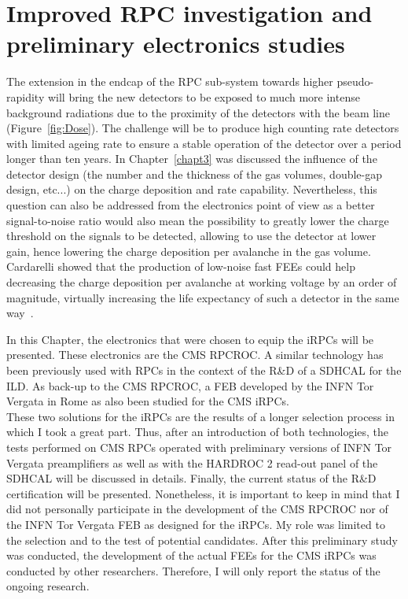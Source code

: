 \renewcommand\evenpagerightmark{{\scshape\small Chapter 6}}
\renewcommand\oddpageleftmark{{\scshape\small Improved RPC investigation and preliminary electronics studies}}

\renewcommand{\bibname}{References}

\hyphenation{}

\chapter[Improved RPC investigation and preliminary electronics studies]%
{Improved RPC investigation and preliminary electronics studies}
\label{chapt6}

	The extension in the endcap of the RPC sub-system towards higher pseudo-rapidity will bring the new detectors to be exposed to much more intense background radiations due to the proximity of the detectors with the beam line (Figure~\ref{fig:Dose}). The challenge will be to produce high counting rate detectors with limited ageing rate to ensure a stable operation of the detector over a period longer than ten years. In Chapter~\ref{chapt3} was discussed the influence of the detector design (the number and the thickness of the gas volumes, double-gap design, etc...) on the charge deposition and rate capability. Nevertheless, this question can also be addressed from the electronics point of view as a better signal-to-noise ratio would also mean the possibility to greatly lower the charge threshold on the signals to be detected, allowing to use the detector at lower gain, hence lowering the charge deposition per avalanche in the gas volume. Cardarelli showed that the production of low-noise fast FEEs could help decreasing the charge deposition per avalanche at working voltage by an order of magnitude, virtually increasing the life expectancy of such a detector in the same way~\cite{CARDARELLI2012}.
	
	In this Chapter, the electronics that were chosen to equip the \acl{iRPCs} will be presented. These electronics are the CMS RPCROC. A similar technology has been previously used with RPCs in the context of the R\&D of a \acf{SDHCAL} for the \acf{ILD}. As back-up to the CMS RPCROC, a FEB developed by the INFN Tor Vergata in Rome as also been studied for the CMS iRPCs.\\
	These two solutions for the iRPCs are the results of a longer selection process in which I took a great part. Thus, after an introduction of both technologies, the tests performed on CMS RPCs operated with preliminary versions of INFN Tor Vergata preamplifiers as well as with the HARDROC 2 read-out panel of the SDHCAL will be discussed in details. Finally, the current status of the R\&D certification will be presented. Nonetheless, it is important to keep in mind that I did not personally participate in the development of the CMS RPCROC nor of the INFN Tor Vergata FEB as designed for the iRPCs. My role was limited to the selection and to the test of potential candidates. After this preliminary study was conducted, the development of the actual FEEs for the CMS iRPCs was conducted by other researchers. Therefore, I will only report the status of the ongoing research.

